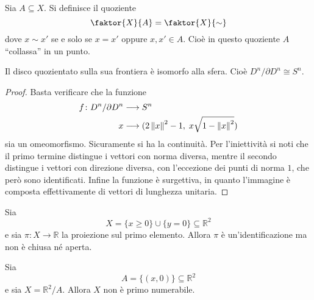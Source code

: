 \begin{defn}
    Sia $A \subseteq X$. Si definisce il quoziente
    \[
    \faktor{X}{A} = \faktor{X}{\sim}
    \]
    dove $x\sim x'$ se e solo se $x = x'$ oppure $x,x'\in A$. Cio\`e in questo quoziente $A$ ``collassa'' in un punto.
\end{defn}

\begin{ex}
    Il disco quozientato sulla sua frontiera \`e isomorfo alla sfera. Cio\`e
    $D^n/\partial D^n\cong S^n$.
\end{ex}
\begin{proof}
    Basta verificare che la funzione
    \begin{align*}
        f\colon D^n/\partial D^n & \longrightarrow S^n\\
        x & \longrightarrow (2 \left\lVert x \right\rVert^2-1,\; x \sqrt{1-\left\lVert x \right\rVert^2})
    \end{align*}
    sia un omeomorfismo. Sicuramente si ha la continuit\`a. Per l'iniettivit\`a
    si noti che il primo termine distingue i vettori con norma diversa, mentre
    il secondo distingue i vettori con direzione diversa, con l'eccezione dei
    punti di norma $1$, che per\`o sono identificati. Infine la funzione \`e
    surgettiva, in quanto l'immagine \`e composta effettivamente di vettori di
    lunghezza unitaria. %
\end{proof}

\begin{ex}
    Sia
    \[
        X = \{x \geq 0\} \cup \{y = 0\} \subseteq \mathbb{R}^2
    \]
    e sia $\pi\colon X \longrightarrow \mathbb{R}$ la proiezione sul primo
    elemento. Allora $\pi$ \`e un'identificazione ma non \`e chiusa n\'e aperta.
\end{ex}

\begin{ex}
    Sia
    \[
        A = \{(x, 0)\} \subseteq \mathbb{R}^2
    \]
    e sia $X = \mathbb{R}^2/A$. Allora $X$ non \`e primo numerabile.
\end{ex}
